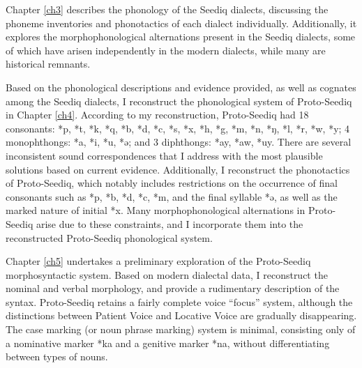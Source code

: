 

Chapter \ref{ch3} describes the phonology of the Seediq dialects, discussing the phoneme inventories and phonotactics of each dialect individually. Additionally, it explores the morphophonological alternations present in the Seediq dialects, some of which have arisen independently in the modern dialects, while many are historical remnants.

Based on the phonological descriptions and evidence provided, as well as cognates among the Seediq dialects, I reconstruct the phonological system of Proto-Seediq in Chapter \ref{ch4}. According to my reconstruction, Proto-Seediq had 18 consonants: *p, *t, *k, *q, *b, *d, *c, *s, *x, *h, *g, *m, *n, *ŋ, *l, *r, *w, *y; 4 monophthongs: *a, *i, *u, *ə; and 3 diphthongs: *ay, *aw, *uy. There are several inconsistent sound correspondences that I address with the most plausible solutions based on current evidence. Additionally, I reconstruct the phonotactics of Proto-Seediq, which notably includes restrictions on the occurrence of final consonants such as *p, *b, *d, *c, *m, and the final syllable *ə, as well as the marked nature of initial *x. Many morphophonological alternations in Proto-Seediq arise due to these constraints, and I incorporate them into the reconstructed Proto-Seediq phonological system.

Chapter \ref{ch5} undertakes a preliminary exploration of the Proto-Seediq morphosyntactic system. Based on modern dialectal data, I reconstruct the nominal and verbal morphology, and provide a rudimentary description of the syntax. Proto-Seediq retains a fairly complete voice ``focus'' system, although the distinctions between Patient Voice and Locative Voice are gradually disappearing. The case marking (or noun phrase marking) system is minimal, consisting only of a nominative marker *ka and a genitive marker *na, without differentiating between types of nouns.

